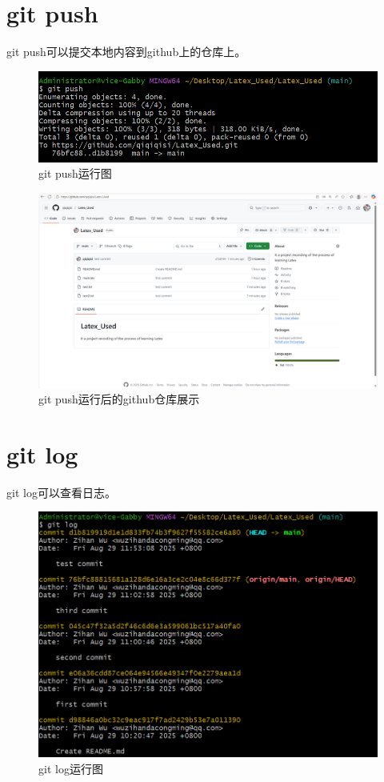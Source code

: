 \documentclass{article}
\begin{document}
\section{git push}
git push可以提交本地内容到github上的仓库上。
\begin{figure}[H]
    \centering
    \includegraphics[width=1\linewidth]{git_push.png}
    \caption{git push运行图}
    \label{fig:push}
\end{figure}
\begin{figure}[H]
    \centering
    \includegraphics[width=1\linewidth]{push_result.png}
    \caption{git push运行后的github仓库展示}
    \label{fig:push1}
\end{figure}

\section{git log}
git log可以查看日志。
\begin{figure}[H]
    \centering
    \includegraphics[width=1\linewidth]{git_log.png}
    \caption{git log运行图}
    \label{fig:log}
\end{figure}
\end{document}
